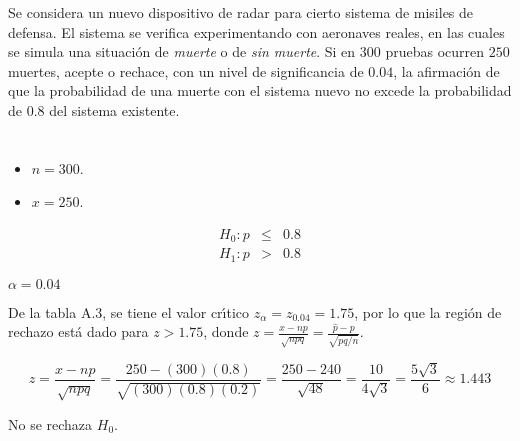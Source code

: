 \begin{enunciado}
 Se considera un nuevo dispositivo de radar
 para cierto sistema de misiles de defensa.
 El sistema se verifica experimentando con aeronaves reales,
 en las cuales se simula una situaci\'on de \textit{muerte} o de \textit{sin muerte}.
 Si en $300$ pruebas ocurren $250$ muertes, acepte o rechace,
 con un nivel de significancia de $0.04$, la afirmaci\'on
 de que la probabilidad de una muerte con el sistema nuevo no excede la probabilidad
 de $0.8$ del sistema existente.
\end{enunciado}

\begin{solucion}
 \begin{datos}
  $\phantom{0}$
  \begin{itemize}
   \item $n = 300$.
   \item $x = 250$.
  \end{itemize}
 \end{datos}

 \begin{hipotesis}
  \begin{eqnarray*}
   H_0: p & \leq & 0.8 \\
   H_1: p &  >   & 0.8
  \end{eqnarray*}
 \end{hipotesis}

 \begin{significancia}
  $\alpha = 0.04$
 \end{significancia}

 \begin{region}
  De la tabla A.3, se tiene el valor cr\'{\i}tico $z_{\alpha} = z_{0.04} = 1.75$,
  por lo que la regi\'on de rechazo est\'a dado para $z > 1.75$,
  donde $z = \frac{x - np}{\sqrt{npq}} 
  = \frac{\widehat{p} - p}{\sqrt{pq/n}}$.
 \end{region}
 
 \begin{estadistico}
  \begin{equation*}
   z = \frac{x - np}{\sqrt{npq}}
   = \frac{250 - (300)(0.8)}{\sqrt{(300)(0.8)(0.2)}}
   = \frac{250 - 240}{\sqrt{48}}
   = \frac{10}{4\sqrt{3}}
   = \frac{5 \sqrt{3}}{6}
   \approx 1.443
  \end{equation*}
 \end{estadistico}

 \begin{decision}
  No se rechaza $H_0$.
 \end{decision}


\end{solucion}

